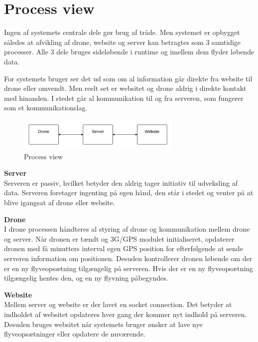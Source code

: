 \section{Process view}

Ingen af systemets centrale dele gør brug af tråde. Men systemet er opbygget således at afvikling af drone, website og server kan betragtes som 3 samtidige processer. Alle 3 dele bruges sideløbende i runtime og imellem dem flyder løbende data.

For systemets bruger ser det ud som om al information går direkte fra website til drone eller omvendt. Men reelt set er websitet og drone aldrig i direkte kontakt med hinanden. I stedet går al kommunikation til og fra serveren, som fungerer som et kommunikationslag. 

\vspace{-5pt}
\begin{figure}[H]
	\centering
	\includegraphics[width=0.7\textwidth]{Billeder/process_view}
	\vspace{0cm}
	\caption{Process view}
	\label{fig:process_view}
\end{figure}

\textbf{Server}\\
Serveren er passiv, hvilket betyder den aldrig tager initiativ til udveksling af data. Serveren foretager ingenting på egen hånd, den står i stedet og venter på at blive igangsat af drone eller website. 
 
\textbf{Drone} \\
I drone processen håndteres al styring af drone og kommunikation mellem drone og server. Når dronen er tændt og 3G/GPS modulet initialiseret, opdaterer dronen med få minutters interval egen GPS position for efterfølgende at sende serveren information om positionen. Desuden kontrollerer dronen løbende om der er en ny flyveopsætning tilgængelig på serveren. Hvis der er en ny flyveopsætning tilgængelig hentes den, og en ny flyvning påbegyndes. 

\textbf{Website}\\
Mellem server og website er der lavet en socket connection. Det betyder at indholdet af websitet opdateres hver gang der kommer nyt indhold på serveren. Desuden bruges websitet når systemets bruger ønsker at lave nye flyveopsætninger eller opdatere de nuværende.\\


